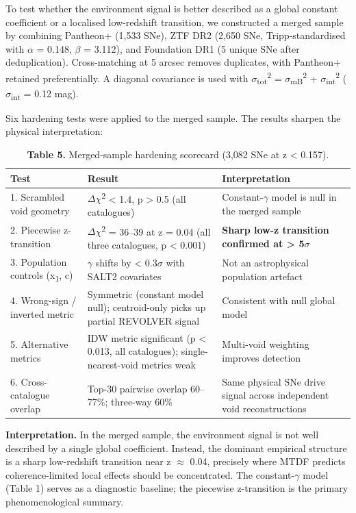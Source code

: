\documentclass[11pt,a4paper]{article}
\begin{document}
To test whether the environment signal is better described as a global constant coefficient or a localised low-redshift transition, we constructed a merged sample by combining Pantheon+ (1,533 SNe), ZTF DR2 (2,650 SNe, Tripp-standardised with $\alpha$ = 0.148, $\beta$ = 3.112), and Foundation DR1 (5 unique SNe after deduplication). Cross-matching at 5 arcsec removes duplicates, with Pantheon+ retained preferentially. A diagonal covariance is used with $\sigma$\textsubscript{tot}\textsuperscript{2} = $\sigma$\textsubscript{mB}\textsuperscript{2} + $\sigma$\textsubscript{int}\textsuperscript{2} ($\sigma$\textsubscript{int} = 0.12 mag).

Six hardening tests were applied to the merged sample. The results sharpen the physical interpretation:

\begin{table}[H]
\centering
\footnotesize
\caption{\textbf{Table 5.} Merged-sample hardening scorecard (3,082 SNe at z < 0.157).}
\begin{tabularx}{\linewidth}{l>{\RaggedRight\arraybackslash}X>{\RaggedRight\arraybackslash}X}
\toprule
\textbf{Test} & \textbf{Result} & \textbf{Interpretation} \tabularnewline
\midrule
1. Scrambled void geometry & $\Delta$$\chi$\textsuperscript{2} < 1.4, p > 0.5 (all catalogues) & Constant-$\gamma$ model is null in the merged sample \tabularnewline
2. Piecewise z-transition & $\Delta$$\chi$\textsuperscript{2} = 36--39 at z = 0.04 (all three catalogues, p < 0.001) & \textbf{Sharp low-z transition confirmed at > 5$\sigma$} \tabularnewline
3. Population controls (x\textsubscript{1}, c) & $\gamma$ shifts by < 0.3$\sigma$ with SALT2 covariates & Not an astrophysical population artefact \tabularnewline
4. Wrong-sign / inverted metric & Symmetric (constant model null); centroid-only picks up partial REVOLVER signal & Consistent with null global model \tabularnewline
5. Alternative metrics & IDW metric significant (p < 0.013, all catalogues); single-nearest-void metrics weak & Multi-void weighting improves detection \tabularnewline
6. Cross-catalogue overlap & Top-30 pairwise overlap 60--77\%; three-way 60\% & Same physical SNe drive signal across independent void reconstructions \tabularnewline
\bottomrule
\end{tabularx}
\end{table}

\textbf{Interpretation.} In the merged sample, the environment signal is not well described by a single global coefficient. Instead, the dominant empirical structure is a sharp low-redshift transition near z $\approx$ 0.04, precisely where MTDF predicts coherence-limited local effects should be concentrated. The constant-$\gamma$ model (Table 1) serves as a diagnostic baseline; the piecewise z-transition is the primary phenomenological summary.
\end{document}
